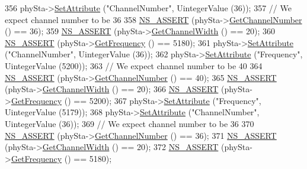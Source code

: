 \begin{DoxyCode}
356       phySta->\hyperlink{classns3_1_1ObjectBase_ac60245d3ea4123bbc9b1d391f1f6592f}{SetAttribute} (\textcolor{stringliteral}{"ChannelNumber"}, UintegerValue (36));
357       \textcolor{comment}{// We expect channel number to be 36 }
358       \hyperlink{assert_8h_a6dccdb0de9b252f60088ce281c49d052}{NS\_ASSERT} (phySta->\hyperlink{classns3_1_1WifiPhy_a5cf0ccf06109ace61db51c83e91b7e8d}{GetChannelNumber} () == 36);
359       \hyperlink{assert_8h_a6dccdb0de9b252f60088ce281c49d052}{NS\_ASSERT} (phySta->\hyperlink{classns3_1_1WifiPhy_a4a5d5009b3b3308f2baeed42a2007189}{GetChannelWidth} () == 20);
360       \hyperlink{assert_8h_a6dccdb0de9b252f60088ce281c49d052}{NS\_ASSERT} (phySta->\hyperlink{classns3_1_1WifiPhy_ad2508d94faf22d690d6b8b4367934fd1}{GetFrequency} () == 5180);
361       phySta->\hyperlink{classns3_1_1ObjectBase_ac60245d3ea4123bbc9b1d391f1f6592f}{SetAttribute} (\textcolor{stringliteral}{"ChannelNumber"}, UintegerValue (36));
362       phySta->\hyperlink{classns3_1_1ObjectBase_ac60245d3ea4123bbc9b1d391f1f6592f}{SetAttribute} (\textcolor{stringliteral}{"Frequency"}, UintegerValue (5200));
363       \textcolor{comment}{// We expect channel number to be 40 }
364       \hyperlink{assert_8h_a6dccdb0de9b252f60088ce281c49d052}{NS\_ASSERT} (phySta->\hyperlink{classns3_1_1WifiPhy_a5cf0ccf06109ace61db51c83e91b7e8d}{GetChannelNumber} () == 40);
365       \hyperlink{assert_8h_a6dccdb0de9b252f60088ce281c49d052}{NS\_ASSERT} (phySta->\hyperlink{classns3_1_1WifiPhy_a4a5d5009b3b3308f2baeed42a2007189}{GetChannelWidth} () == 20);
366       \hyperlink{assert_8h_a6dccdb0de9b252f60088ce281c49d052}{NS\_ASSERT} (phySta->\hyperlink{classns3_1_1WifiPhy_ad2508d94faf22d690d6b8b4367934fd1}{GetFrequency} () == 5200);
367       phySta->\hyperlink{classns3_1_1ObjectBase_ac60245d3ea4123bbc9b1d391f1f6592f}{SetAttribute} (\textcolor{stringliteral}{"Frequency"}, UintegerValue (5179));
368       phySta->\hyperlink{classns3_1_1ObjectBase_ac60245d3ea4123bbc9b1d391f1f6592f}{SetAttribute} (\textcolor{stringliteral}{"ChannelNumber"}, UintegerValue (36));
369       \textcolor{comment}{// We expect channel number to be 36 }
370       \hyperlink{assert_8h_a6dccdb0de9b252f60088ce281c49d052}{NS\_ASSERT} (phySta->\hyperlink{classns3_1_1WifiPhy_a5cf0ccf06109ace61db51c83e91b7e8d}{GetChannelNumber} () == 36);
371       \hyperlink{assert_8h_a6dccdb0de9b252f60088ce281c49d052}{NS\_ASSERT} (phySta->\hyperlink{classns3_1_1WifiPhy_a4a5d5009b3b3308f2baeed42a2007189}{GetChannelWidth} () == 20);
372       \hyperlink{assert_8h_a6dccdb0de9b252f60088ce281c49d052}{NS\_ASSERT} (phySta->\hyperlink{classns3_1_1WifiPhy_ad2508d94faf22d690d6b8b4367934fd1}{GetFrequency} () == 5180);

\end{DoxyCode}
